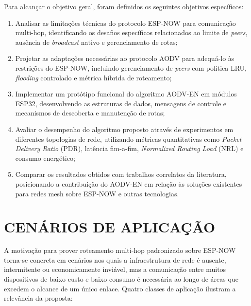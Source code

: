 Para alcançar o objetivo geral, foram definidos os seguintes objetivos
específicos:

\begin{enumerate}
\def\labelenumi{\alph{enumi})}
\tightlist
\item
  Analisar as limitações técnicas do protocolo ESP-NOW para comunicação
  multi-hop, identificando os desafios específicos relacionados ao
  limite de \emph{peers}, ausência de \emph{broadcast} nativo e
  gerenciamento de rotas;
\item
  Projetar as adaptações necessárias ao protocolo AODV para adequá-lo às
  restrições do ESP-NOW, incluindo gerenciamento de \emph{peers} com
  política LRU, \emph{flooding} controlado e métrica híbrida de
  roteamento;
\item
  Implementar um protótipo funcional do algoritmo AODV-EN em módulos
  ESP32, desenvolvendo as estruturas de dados, mensagens de controle e
  mecanismos de descoberta e manutenção de rotas;
\item
  Avaliar o desempenho do algoritmo proposto através de experimentos em
  diferentes topologias de rede, utilizando métricas quantitativas como
  \emph{Packet Delivery Ratio} (PDR), latência fim-a-fim,
  \emph{Normalized Routing Load} (NRL) e consumo energético;
\item
  Comparar os resultados obtidos com trabalhos correlatos da literatura,
  posicionando a contribuição do AODV-EN em relação às soluções
  existentes para redes mesh sobre ESP-NOW e outras tecnologias.
\end{enumerate}

\section{CENÁRIOS DE APLICAÇÃO}\label{cenarios-de-aplicacao}

A motivação para prover roteamento multi-hop padronizado sobre ESP-NOW
torna-se concreta em cenários nos quais a infraestrutura de rede é
ausente, intermitente ou economicamente inviável, mas a comunicação entre
muitos dispositivos de baixo custo e baixo consumo é necessária ao longo
de áreas que excedem o alcance de um único enlace. Quatro classes de
aplicação ilustram a relevância da proposta:

